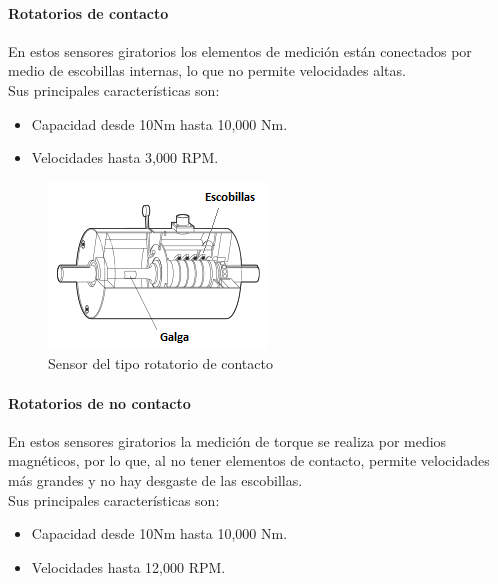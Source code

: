 \documentclass[12pt,titlepage]{article}
\begin{document}
\paragraph{Rotatorios de contacto}\leavevmode\newline
En estos sensores giratorios los elementos de medición están conectados por medio de escobillas internas, lo que no permite velocidades altas. \\

Sus principales características son:
\begin{itemize}
\item Capacidad desde 10Nm hasta 10,000 Nm.
\item Velocidades hasta 3,000 RPM. \\
\end{itemize}
\begin{figure}[htbp]
\hspace*{4.6cm} 
\includegraphics[scale=0.89]{contacto_sens}
\caption{Sensor del tipo rotatorio de contacto}
\end{figure}

\paragraph{Rotatorios de no contacto}\leavevmode\newline
En estos sensores giratorios la medición de torque se realiza por medios magnéticos, por lo que, al no tener elementos de contacto, permite velocidades más grandes y no hay desgaste de las escobillas. \\

Sus principales características son:
\begin{itemize}
\item Capacidad desde 10Nm hasta 10,000 Nm.
\item Velocidades hasta 12,000 RPM. \\
\end{itemize}
\end{document}
